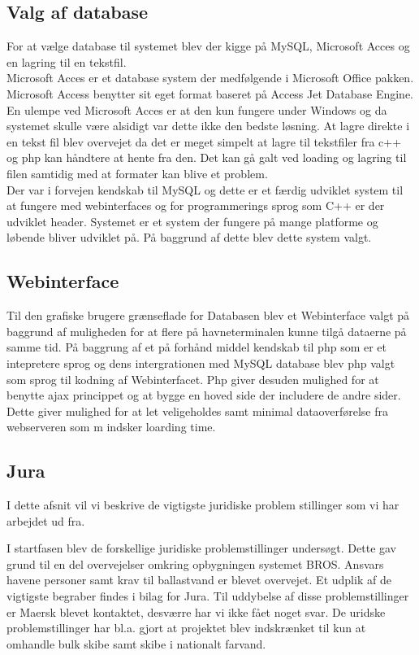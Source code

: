 \subsection{Valg af database}
For at vælge database til systemet blev der kigge på MySQL, Microsoft Acces og en lagring til en tekstfil.\\
Microsoft Acces er et database system der medfølgende i Microsoft Office pakken. Microsoft Access benytter sit eget format baseret på Access Jet Database Engine. En ulempe ved Microsoft Acces er at den kun fungere under Windows og da systemet skulle være alsidigt var dette ikke den bedste løsning. At lagre direkte i en tekst fil blev overvejet da det er meget simpelt at lagre til tekstfiler fra c++ og php kan håndtere at hente fra den. Det kan gå galt ved loading og lagring til filen samtidig med at formater kan blive et problem. \\
Der var i forvejen kendskab til MySQL og dette er et færdig udviklet system til at fungere med webinterfaces og for programmerings sprog som C++ er der udviklet header. Systemet er et system der fungere på mange platforme og løbende bliver udviklet på. På baggrund af dette blev dette system valgt.

\subsection{Webinterface}
Til den grafiske brugere grænseflade for Databasen blev et Webinterface valgt på baggrund af muligheden for at flere på havneterminalen kunne tilgå dataerne på samme tid. På baggrung af et på forhånd middel kendskab til php som er et  intepretere sprog og dens intergrationen med MySQL database blev php valgt som sprog til kodning af Webinterfacet. Php giver desuden mulighed for at benytte ajax princippet og at bygge en hoved side der includere de andre sider. Dette giver mulighed for at let veligeholdes samt minimal dataoverførelse fra webserveren som m indsker loarding time.

\subsection{Jura}
I dette afsnit vil vi beskrive de vigtigste juridiske problem stillinger som vi har arbejdet ud fra.

I startfasen blev de forskellige juridiske problemstillinger undersøgt. Dette gav grund til en del overvejelser omkring opbygningen systemet BROS. Ansvars havene personer samt krav til ballastvand er blevet overvejet. Et udplik af de vigtigste begraber findes i bilag for Jura.
Til uddybelse af disse problemstillinger er Maersk blevet kontaktet, desværre har vi ikke fået noget svar. De uridske problemstillinger har bl.a. gjort at projektet blev indskrænket til kun at omhandle bulk skibe samt skibe i nationalt farvand.


